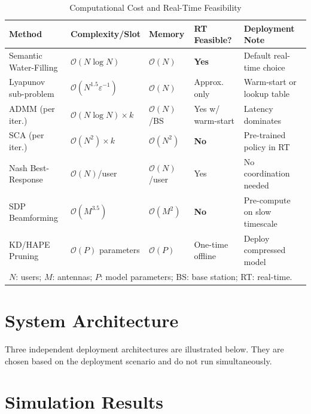 \documentclass[conference]{IEEEtran}
\begin{document}
\begin{table}[!t]
\renewcommand{\arraystretch}{1.22}
\caption{Computational Cost and Real-Time Feasibility}
\label{tab:complexity}
\centering
\begin{tabular}{@{}p{2.8cm} p{2.4cm} p{1.3cm} p{1.8cm} p{4.0cm}@{}}
\toprule
\textbf{Method} & \textbf{Complexity/Slot} & \textbf{Memory} & \textbf{RT Feasible?} & \textbf{Deployment Note} \\
\midrule
Semantic Water-Filling    & $\mathcal{O}(N\log N)$       & $\mathcal{O}(N)$   & \textbf{Yes}         & Default real-time choice \\
Lyapunov sub-problem      & $\mathcal{O}(N^{1.5}\varepsilon^{-1})$ & $\mathcal{O}(N)$ & Approx. only & Warm-start or lookup table \\
ADMM (per iter.)          & $\mathcal{O}(N\log N)\times k$  & $\mathcal{O}(N)$/BS & Yes w/ warm-start & Latency dominates \\
SCA (per iter.)           & $\mathcal{O}(N^2)\times k$   & $\mathcal{O}(N^2)$ & \textbf{No}          & Pre-trained policy in RT \\
Nash Best-Response        & $\mathcal{O}(N)$/user        & $\mathcal{O}(N)$/user & Yes               & No coordination needed \\
SDP Beamforming           & $\mathcal{O}(M^{3.5})$       & $\mathcal{O}(M^2)$ & \textbf{No}          & Pre-compute on slow timescale \\
KD/HAPE Pruning           & $\mathcal{O}(P)$ parameters  & $\mathcal{O}(P)$   & One-time offline     & Deploy compressed model \\
\bottomrule
\multicolumn{5}{l}{\small $N$: users; $M$: antennas; $P$: model parameters; BS: base station; RT: real-time.}
\end{tabular}
\end{table}

\section{System Architecture}
\label{sec:arch}

Three independent deployment architectures are illustrated below. They are chosen based on the deployment scenario and do not run simultaneously.

\section{Simulation Results}
\label{sec:results}
\end{document}
